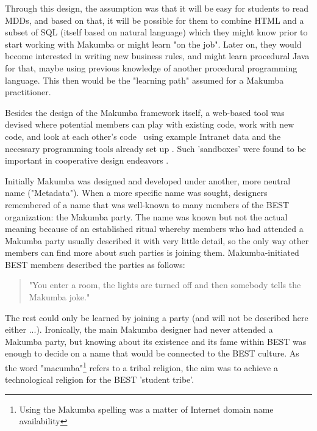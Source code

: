 \documentclass{sig-alt-release2}
\begin{document}
Through this design, the assumption was that it will be easy for students to read MDDs, and based on that, it will be possible for them to combine HTML and a subset of SQL (itself based on natural language) which they might know prior to start working with Makumba or might learn "on the job". Later on, they would become interested in writing new business rules, and might learn procedural Java for that, maybe using previous knowledge of another procedural programming language. This then would be the "learning path" assumed for a Makumba practitioner.

Besides the design of the Makumba framework itself, a web-based tool was devised where potential members can play with existing code, work with new code, and look at each other's code \, using example Intranet data and the necessary programming tools already set up \cite{bogdan08} . Such 'sandboxes' were found to be important in cooperative design endeavors \cite{trigg00}.


Initially Makumba was designed and developed under another, more neutral name ("Metadata"). When a more specific name was sought, designers remembered of a name that was well-known to many members of the BEST organization: the Makumba party. The name was known but not the actual meaning because of an established ritual whereby members who had attended a Makumba party usually described it with very little detail,  so the only way other members can find more about such parties is joining them.	 Makumba-initiated BEST members described the parties as follows:
\begin{quotation}
	"You enter a room, the lights are turned off and then somebody tells the Makumba joke."
\end{quotation}

The rest could only be learned by joining a party (and will not be described here either ...). Ironically, the main Makumba designer had never attended a Makumba party, but knowing about its existence and its fame within BEST was enough to decide on a name that would be connected to the BEST culture. As the word "macumba"\footnote{Using the Makumba spelling was a matter of Internet domain name availability} refers to a tribal religion, the aim was to achieve a technological religion for the BEST 'student tribe'.
\end{document}
